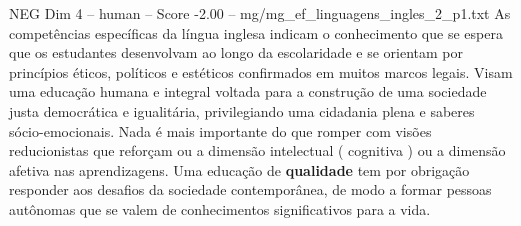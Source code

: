 \begin{textsample}{NEG Dim 4 – human – Score -2.00 – mg/mg\_ef\_linguagens\_ingles\_2\_p1.txt}  \label{ex:f4_neg_006}
As competências específicas da língua inglesa indicam o conhecimento que se espera que os estudantes desenvolvam ao longo da escolaridade e se orientam por princípios éticos, políticos e estéticos confirmados em muitos marcos legais.
Visam uma educação humana e integral voltada para a construção de uma sociedade justa democrática e igualitária, privilegiando uma cidadania plena e saberes sócio-emocionais.
Nada é mais importante do que romper com visões reducionistas que reforçam ou a dimensão intelectual ( cognitiva ) ou a dimensão afetiva nas aprendizagens.
Uma educação de \textbf{qualidade} tem por obrigação responder aos desafios da sociedade contemporânea, de modo a formar pessoas autônomas que se valem de conhecimentos significativos para a vida.

\end{textsample}
